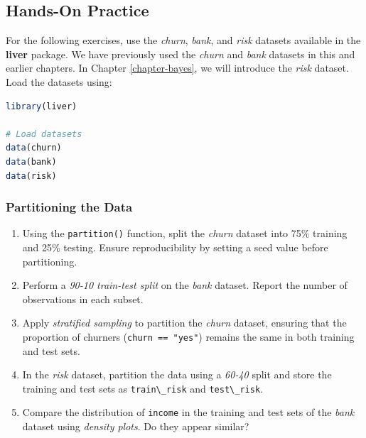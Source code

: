 \documentclass[
]{book}
\newcommand{\passthrough}[1]{#1}
\theoremstyle{definition}
\theoremstyle{definition}
\theoremstyle{definition}
\theoremstyle{definition}
\theoremstyle{remark}
\begin{document}
\subsection*{Hands-On Practice}\label{hands-on-practice}

For the following exercises, use the \emph{churn}, \emph{bank}, and \emph{risk} datasets available in the \textbf{liver} package. We have previously used the \emph{churn} and \emph{bank} datasets in this and earlier chapters. In Chapter \ref{chapter-bayes}, we will introduce the \emph{risk} dataset. Load the datasets using:

\begin{lstlisting}[language=R]
library(liver)

# Load datasets
data(churn)
data(bank)
data(risk)
\end{lstlisting}

\subsubsection*{Partitioning the Data}\label{partitioning-the-data}

\begin{enumerate}
\def\labelenumi{\arabic{enumi}.}
\setcounter{enumi}{14}
\item
  Using the \passthrough{\lstinline!partition()!} function, split the \emph{churn} dataset into 75\% training and 25\% testing. Ensure reproducibility by setting a seed value before partitioning.
\item
  Perform a \emph{90-10 train-test split} on the \emph{bank} dataset. Report the number of observations in each subset.
\item
  Apply \emph{stratified sampling} to partition the \emph{churn} dataset, ensuring that the proportion of churners (\passthrough{\lstinline!churn == "yes"!}) remains the same in both training and test sets.
\item
  In the \emph{risk} dataset, partition the data using a \emph{60-40} split and store the training and test sets as \passthrough{\lstinline!train\_risk!} and \passthrough{\lstinline!test\_risk!}.
\item
  Compare the distribution of \passthrough{\lstinline!income!} in the training and test sets of the \emph{bank} dataset using \emph{density plots}. Do they appear similar?
\end{enumerate}
\end{document}
